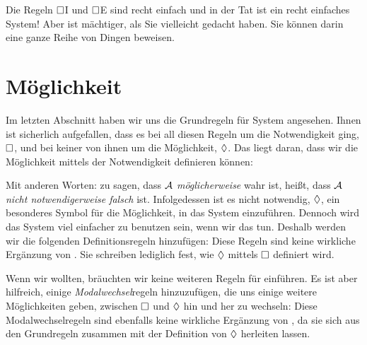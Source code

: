 Die Regeln $\Box$I und $\Box$E sind recht einfach und in der Tat ist \mlK{} ein recht einfaches System! Aber \mlK{}ist mächtiger, als Sie vielleicht gedacht haben. Sie können darin eine ganze Reihe von Dingen beweisen.

\section{Möglichkeit}
\label{possibility}

Im letzten Abschnitt haben wir uns die Grundregeln für System \mlK angesehen. Ihnen ist sicherlich aufgefallen, dass es bei all diesen Regeln um die Notwendigkeit ging, $\Box$, und bei keiner von ihnen um die Möglichkeit, $\Diamond$. Das liegt daran, dass wir die Möglichkeit mittels der Notwendigkeit definieren können:

Mit anderen Worten: zu sagen, dass $\mathcal{A}$ \emph{möglicherweise} wahr ist, heißt, dass $\mathcal{A}$ \emph{nicht notwendigerweise falsch} ist. Infolgedessen ist es nicht notwendig, $\Diamond$, ein besonderes Symbol für die Möglichkeit, in das System \mlK einzuführen. Dennoch wird das System viel einfacher zu benutzen sein, wenn wir das tun. Deshalb werden wir die folgenden Definitionsregeln hinzufügen:
Diese Regeln sind keine wirkliche Ergänzung von \mlK. Sie schreiben lediglich fest, wie $\Diamond$ mittels $\Box$ definiert wird.

Wenn wir wollten, bräuchten wir keine weiteren Regeln für \mlK{} einführen. Es ist aber hilfreich, einige \emph{Modalwechsel}regeln hinzuzufügen, die uns einige weitere Möglichkeiten geben, zwischen $\Box$ und $\Diamond$ hin und her zu wechseln:
Diese Modalwechselregeln sind ebenfalls keine wirkliche Ergänzung von \mlK, da sie sich aus den Grundregeln zusammen mit der Definition von $\Diamond$ herleiten lassen.

